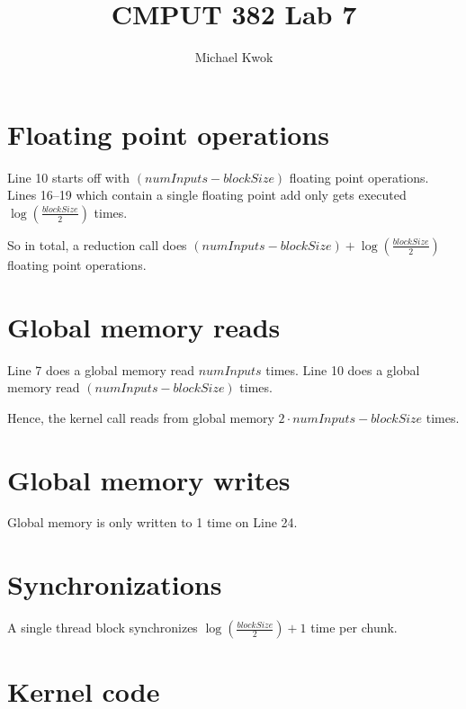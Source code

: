 \documentclass{article}
\title{CMPUT 382 Lab 7}
\author{Michael Kwok}
\begin{document}
\maketitle
\section{Floating point operations}
Line 10 starts off with \(\left(numInputs - blockSize\right)\) floating point operations.
Lines 16--19 which contain a single floating point add only gets executed \(\log\left(\frac{blockSize}{2}\right)\) times.

So in total, a reduction call does \( \left(numInputs - blockSize\right) + \log\left(\frac{blockSize}{2}\right) \) floating point operations.
\section{Global memory reads}
Line 7 does a global memory read \(numInputs\) times.
Line 10 does a global memory read \(\left(numInputs - blockSize\right)\) times.

Hence, the kernel call reads from global memory \( 2 \cdot numInputs - blockSize \) times.
\section{Global memory writes}
Global memory is only written to 1 time on Line 24.
\section{Synchronizations}
A single thread block synchronizes \(\log\left(\frac{blockSize}{2}\right) + 1\) time per chunk.
\newpage
\appendix
\section{Kernel code}
\inputminted{cuda}{test.cu}
\end{document}
